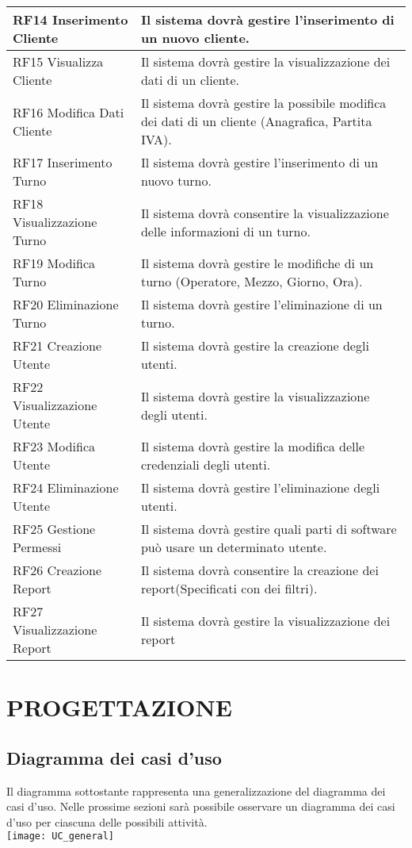\documentclass[green, fancy, 11pt]{elegantbook}
\begin{document}
\begin{center}
{\begin{tabular}{|p{5cm}|p{10cm}|}
	\hline
	RF14 Inserimento Cliente & Il sistema dovrà gestire l'inserimento di un nuovo cliente.\\
	\hline
	RF15 Visualizza Cliente & Il sistema dovrà gestire la visualizzazione dei dati di un cliente.\\
	\hline
	RF16 Modifica Dati Cliente & Il sistema dovrà gestire la possibile modifica dei dati di un cliente (Anagrafica, Partita IVA).\\
	\hline
	RF17 Inserimento Turno & Il sistema dovrà gestire l'inserimento di un nuovo turno.\\
	\hline
	RF18 Visualizzazione Turno & Il sistema dovrà consentire la visualizzazione delle informazioni di un turno.\\
	\hline
	RF19 Modifica Turno & Il sistema dovrà gestire le modifiche di un turno (Operatore, Mezzo, Giorno, Ora).\\
	\hline
	RF20 Eliminazione Turno& Il sistema dovrà gestire l'eliminazione di un turno.\\
	\hline
	RF21 Creazione Utente& Il sistema dovrà gestire la creazione degli utenti.\\
	\hline
	RF22 Visualizzazione Utente& Il sistema dovrà gestire la visualizzazione degli utenti.\\
	\hline
	RF23 Modifica Utente& Il sistema dovrà gestire la modifica delle credenziali degli utenti.\\
	\hline
	RF24 Eliminazione Utente& Il sistema dovrà gestire l'eliminazione degli utenti.\\
	\hline
	RF25 Gestione Permessi&Il sistema dovrà gestire quali parti di software può usare un determinato utente.\\
	\hline
	RF26 Creazione Report&Il sistema dovrà consentire la creazione dei report(Specificati con dei filtri).\\
	\hline
	RF27 Visualizzazione Report&Il sistema dovrà gestire la visualizzazione dei report\\
	\hline
\end{tabular}
}
\end{center}

\chapter{PROGETTAZIONE}
\section{Diagramma dei casi d'uso}
\noindent
Il diagramma sottostante rappresenta una generalizzazione del diagramma dei casi d'uso. Nelle prossime sezioni sarà possibile osservare un diagramma dei casi d'uso per ciascuna delle possibili attività.\\
\small
\texttt{[image: UC\_general]}
\newpage
\end{document}
